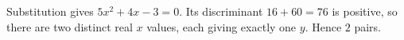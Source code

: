 Substitution gives $5x^2+4x-3=0$. Its discriminant $16+60=76$ is positive, so there are two distinct real $x$ values, each giving exactly one $y$. Hence $\boxed2$ pairs.
